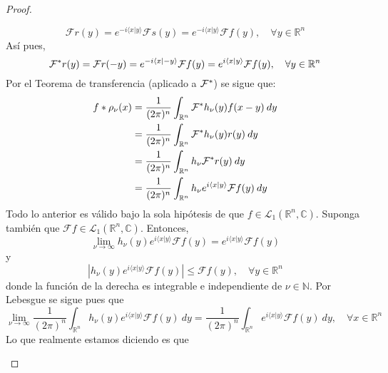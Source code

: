 \documentclass[12pt]{report}
\theoremstyle{largebreak}
\renewcommand{\leq}{\ensuremath{\leqslant}}
\newcommand\abs[1]{\ensuremath{\left|#1\right|}}
\newcommand\pint[2]{\ensuremath{\langle#1| #2\rangle}}
\newcommand{\fou}[1]{\ensuremath{\mathcal{F}#1}}
\begin{document}
\begin{proof}
\begin{enumerate}
\begin{equation*}
                \fou{r}(y)=e^{ -i\pint{x}{y}}\fou{s}(y)=e^{ -i\pint{x}{y}}\fou{f}(y),\quad\forall y\in\mathbb{R}^n
            \end{equation*}
            Así pues,
            \begin{equation*}
                \fou^*{r}(y)=\fou{r}(-y)=e^{-i\pint{x}{-y}}\fou{f}(y)=e^{ i\pint{x}{y}}\fou{f}(y),\quad\forall y\in\mathbb{R}^n
            \end{equation*}
            Por el Teorema de transferencia (aplicado a $\fou^*{}$) se sigue que:
            \begin{equation*}
                \begin{split}
                    f*\rho_\nu(x)&=\frac{1}{(2\pi)^n}\int_{\mathbb{R}^n}\fou^*{h_\nu}(y)f(x-y)\:dy\\
                    &=\frac{1}{(2\pi)^n}\int_{\mathbb{R}^n}\fou^*{h_\nu}(y)r(y)\:dy\\
                    &=\frac{1}{(2\pi)^n}\int_{\mathbb{R}^n}h_\nu\fou^*{r}(y)\:dy\\
                    &=\frac{1}{(2\pi)^n}\int_{\mathbb{R}^n}h_\nu e^{i\pint{x}{y}}\fou{f}(y)\:dy\\
                \end{split}
            \end{equation*}
            Todo lo anterior es válido bajo la sola hipótesis de que $f\in\mathcal{L}_1(\mathbb{R}^n,\mathbb{C})$. Suponga también que $\fou{f}\in\mathcal{L}_1(\mathbb{R}^n,\mathbb{C})$. Entonces,
            \begin{equation*}
                \lim_{ \nu\rightarrow\infty}h_\nu(y)e^{ i\pint{x}{y}}\fou{f}(y)=e^{ i\pint{x}{y}}\fou{f}(y)
            \end{equation*}
            y
            \begin{equation*}
                \abs{h_\nu(y)e^{ i\pint{x}{y}}\fou{f}(y)}\leq\fou{f}(y),\quad\forall y\in\mathbb{R}^n
            \end{equation*}
            donde la función de la derecha es integrable e independiente de $\nu\in\mathbb{N}$. Por Lebesgue se sigue pues que
            \begin{equation*}
                \lim_{ \nu\rightarrow\infty}\frac{1}{(2\pi)^n}\int_{\mathbb{R}^n}h_\nu(y)e^{ i\pint{x}{y}}\fou{f}(y)\:dy=\frac{1}{(2\pi)^n}\int_{\mathbb{R}^n}e^{ i\pint{x}{y}}\fou{f}(y)\:dy,\quad\forall x\in\mathbb{R}^n
            \end{equation*}
            Lo que realmente estamos diciendo es que
            \begin{equation*}

\end{equation*}
\end{enumerate}
\end{proof}
\end{document}
